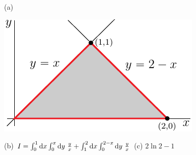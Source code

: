 %

\begin{answer}
(a)
\begin{center}
     \includegraphics{fig/OE09D_6.pdf}
\end{center}

(b) $I=\int_0^1\dee{x}\int_0^x\dee{y}\ \frac{y}{x}
  +\int_1^2\dee{x}\int_0^{2-x}\dee{y}\ \frac{y}{x}$\qquad
(c) $2\ln 2 -1$
\end{answer}

